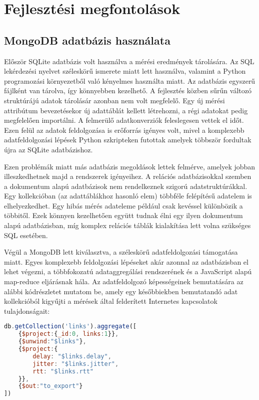 
\section{Fejlesztési megfontolások}


\subsection{MongoDB adatbázis használata}
Először SQLite adatbázis volt használva a mérési eredmények tárolására. Az SQL lekérdezési nyelvet széleskörű ismerete miatt lett használva, valamint a Python programozási környezetből való kényelmes használta miatt. Az adatbázis egyszerű fájlként van tárolva, így könnyebben kezelhető. A fejlesztés közben sűrűn változó struktúrájú adatok tárolásár azonban nem volt megfelelő. Egy új mérési attribútum bevezetésekor új adattáblát kellett létrehozni, a régi adatokat pedig megfelelően importálni. A felmerülő adatkonverziók feleslegesen vettek el időt. Ezen felül az adatok feldolgozása is erőforrás igényes volt, mivel a komplexebb adatfeldolgozási lépések Python szkripteken futottak amelyek többször fordultak újra az SQLite adatbázishoz.

Ezen problémák miatt más adatbázis megoldások lettek felmérve, amelyek jobban illeszkedhetnek majd a rendszerek igényeihez. A relációs adatbázisokkal szemben a dokumentum alapú adatbázisok nem rendelkeznek szigorú adatstruktúrákkal. Egy kollekcióban (az adattáblákhoz hasonló elem) többféle felépítésű adatelem is elhelyezkedhet. Egy hibás mérés adateleme például csak kevéssel különbözik a többitől. Ezek könnyen kezelhetően együtt tudnak élni egy ilyen dokumentum alapú adatbázisban, míg komplex relációs táblák kialakítása lett volna szükséges SQL esetében.

Végül a MongoDB lett kiválasztva, a széleskörű adatfeldolgozási támogatása miatt. Egyes komplexebb feldolgozási lépéseket akár azonnal az adatbázisban el lehet végezni, a többfokozatú adataggregálási rendszerének és a JavaScript alapú map-reduce eljárásnak hála. Az adatfeldolgozó képességeinek bemutatására az alábbi kódrészletet mutatom be, amely egy későbbiekben bemutatandó adat kollekcióból kigyűjti a mérések által felderített Internetes kapcsolatok tulajdonságait:

\begin{lstlisting}[language=JavaScript]
db.getCollection('links').aggregate([
    {$project:{_id:0, links:1}},
    {$unwind:"$links"},
    {$project:{
        delay: "$links.delay",
        jitter: "$links.jitter",
        rtt: "$links.rtt"
    }},
    {$out:"to_export"}
])
\end{lstlisting}

